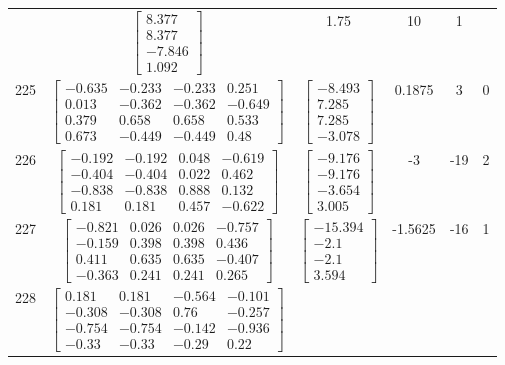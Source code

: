 \documentclass[a4paper,12pt]{article}
\begin{document}
\begin{tabular}{c c c c c c}
&
$\begin{bmatrix} 8.377 \\ 8.377 \\ -7.846 \\ 1.092 \end{bmatrix}$
&
1.75
&
10
&
1
\\
225
&
$\begin{bmatrix} -0.635 & -0.233 & -0.233 & 0.251 \\ 0.013 & -0.362 & -0.362 & -0.649 \\ 0.379 & 0.658 & 0.658 & 0.533 \\ 0.673 & -0.449 & -0.449 & 0.48 \end{bmatrix}$
&
$\begin{bmatrix} -8.493 \\ 7.285 \\ 7.285 \\ -3.078 \end{bmatrix}$
&
0.1875
&
3
&
0
\\
226
&
$\begin{bmatrix} -0.192 & -0.192 & 0.048 & -0.619 \\ -0.404 & -0.404 & 0.022 & 0.462 \\ -0.838 & -0.838 & 0.888 & 0.132 \\ 0.181 & 0.181 & 0.457 & -0.622 \end{bmatrix}$
&
$\begin{bmatrix} -9.176 \\ -9.176 \\ -3.654 \\ 3.005 \end{bmatrix}$
&
-3
&
-19
&
2
\\
227
&
$\begin{bmatrix} -0.821 & 0.026 & 0.026 & -0.757 \\ -0.159 & 0.398 & 0.398 & 0.436 \\ 0.411 & 0.635 & 0.635 & -0.407 \\ -0.363 & 0.241 & 0.241 & 0.265 \end{bmatrix}$
&
$\begin{bmatrix} -15.394 \\ -2.1 \\ -2.1 \\ 3.594 \end{bmatrix}$
&
-1.5625
&
-16
&
1
\\
228
&
$\begin{bmatrix} 0.181 & 0.181 & -0.564 & -0.101 \\ -0.308 & -0.308 & 0.76 & -0.257 \\ -0.754 & -0.754 & -0.142 & -0.936 \\ -0.33 & -0.33 & -0.29 & 0.22 \end{bmatrix}$

\end{tabular}
\end{document}
